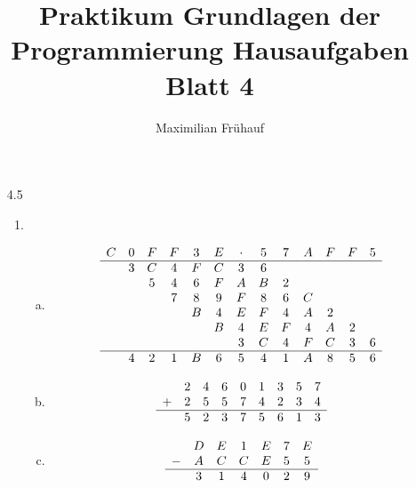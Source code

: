 \documentclass[a4paper, 10pt]{article}
\title{Praktikum Grundlagen der Programmierung Hausaufgaben Blatt 4}
\author{Maximilian Frühauf}
\begin{document}
\maketitle
\begin{enumerate}
	\item[4.5]
	      \begin{enumerate}[1.]
		      \item \begin{enumerate}[(a)]
			            \item \[
				                  \begin{array}{ ccccccccccccc }
					                  C & 0 & F & F & 3 & E & \cdot & 5 & 7 & A & F & F & 5 \\
					                  \hline
					                  & 3 & C & 4 & F & C & 3 & 6 \\
					                  & & 5 & 4 &6 & F &A& B &2 \\
					                  & & & 7 &8 &9 &F & 8 &6 &C \\
					                  & & & & B & 4 & E & F & 4 & A & 2 \\
					                  & & & & & B & 4 & E & F & 4 & A & 2 \\
					                    &   &   &   &   &   & 3     & C & 4 & F & C & 3 & 6 \\
					                  \hline
					                    & 4 & 2 & 1 & B & 6 & 5     & 4 & 1 & A & 8 & 5 & 6 \\
				                  \end{array}
			                  \]
			            \item \[
				                  \begin{array}{ccccccccc}
					                    & 2 & 4 & 6 & 0 & 1 & 3 & 5 & 7 \\
					                  + & 2 & 5 & 5 & 7 & 4 & 2 & 3 & 4 \\
					                  \hline
					                    & 5 & 2 & 3 & 7 & 5 & 6 & 1 & 3 \\
				                  \end{array}
			                  \]
			            \item \[
				                  \begin{array}{ccccccc}
					                    & D & E & 1 & E & 7 & E \\
					                  - & A & C & C & E & 5 & 5 \\
					                  \hline
					                    & 3 & 1 & 4 & 0 & 2 & 9 \\

\end{array}\]
\end{enumerate}
\end{enumerate}
\end{enumerate}
\end{document}
